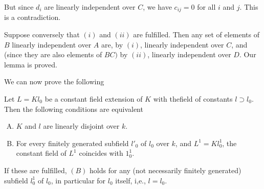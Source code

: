 But since $d_i$ are linearly independent over $C$, we have $c_{ij} =
0$ for all $i $ and $j$. This is a contradiction. 

Suppose conversely that $(i)$ and $(ii)$ are fulfilled. Then any set
of elements of $B$ linearly independent over $A$ are, by $(i)$,
linearly independent over $C$, and (since they are also elements of
$BC)$ by $(ii)$, linearly independent over $D$. Our lemma is proved. 

We can now prove the following

\begin{theorem*}
  Let $L = Kl_0$ be a constant field extension of $K$ with the\pageoriginale field
  of constants $l \supset l_0$. Then the following conditions are
  equivalent 
  \begin{enumerate} [(A)]
  \item $K$ and $l$ are linearly disjoint over $k$.
  \item  For every finitely generated subfield $l'_0 $ of $l_0$ over
    $k$, and $L^1 = Kl_0^1$, the constant field of $L^1$ coincides
    with $1^1_0$. 
  \end{enumerate}
\end{theorem*}

If these are fulfilled, $(B)$ holds for any (not necessarily finitely
generated) subfield $l^1_0$ of $l_0$, in particular for $l_0$ itself,
i,e., $l = l_0$. 

